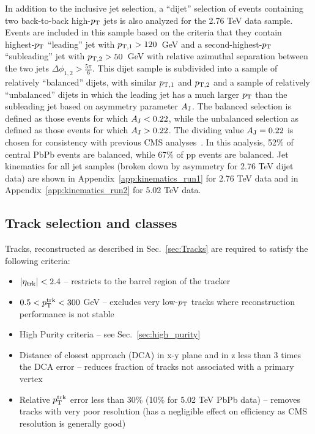 In addition to the inclusive jet selection, a ``dijet'' selection of events containing two back-to-back high-$p_{\rm T}$ jets is also analyzed for the 2.76 TeV data sample.  Events are included in this sample based on the criteria that they contain highest-$p_{\rm T}$ ``leading'' jet with $p_{\rm T,1} > 120$~GeV and a second-highest-$p_{\rm T}$ ``subleading'' jet with $p_{\rm T,2} > 50$~GeV with relative azimuthal separation between the two jets $\Delta\phi_{1,2} > \frac{5\pi}{6}$.  This dijet sample is subdivided into a sample of relatively ``balanced'' dijets, with similar $p_{\rm T,1}$ and $p_{\rm T,2}$ and a sample of relatively ``unbalanced'' dijets in which the leading jet has a much larger $p_{\rm T}$ than the subleading jet based on asymmetry parameter $A_{\rm J}$. The balanced selection is defined as those events for which $A_{\rm J} < 0.22$, while the unbalanced selection as defined as those events for which $A_{\rm J} > 0.22$.  The dividing value $A_{\rm J} = 0.22$ is chosen for consistency with previous CMS analyses~\cite{Chatrchyan:2011sx, HIN_2014_010}.  In this analysis, 52\% of central PbPb events are balanced, while 67\% of pp events are balanced.  Jet kinematics for all jet samples (broken down by asymmetry for 2.76 TeV dijet data) are shown in Appendix~\ref{app:kinematics_run1} for 2.76 TeV data and in Appendix~\ref{app:kinematics_run2} for 5.02 TeV data.

\subsection{Track selection and classes}

Tracks, reconstructed as described in Sec.~\ref{sec:Tracks} are required to satisfy the following criteria: 
\begin{itemize}
\item  $|\eta_{\rm trk}| < 2.4$ -- restricts to the barrel region of the tracker
\item  $0.5 < p_{\rm T}^{\rm trk} < 300$ GeV -- excludes very low-$p_{\rm T}$ tracks where reconstruction performance is not stable
\item High Purity criteria  -- see  Sec.~\ref{sec:high_purity}
\item Distance of closest approach (DCA) in x-y plane and in z less than 3 times the DCA error -- reduces fraction of tracks not associated with a primary vertex
\item Relative $p_{\rm T}^{\rm trk}$ error less than 30\% (10\% for 5.02 TeV PbPb data) -- removes tracks with very poor resolution (has a negligible effect on efficiency as CMS resolution is generally good) 
\end{itemize}

